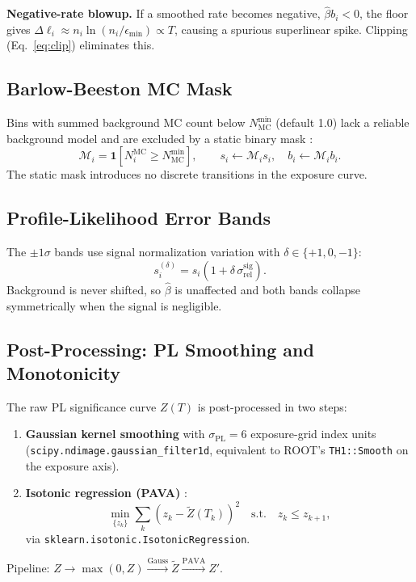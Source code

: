 \documentclass[12pt,a4paper]{article}
\newcommand{\bhat}{\hat{\beta}}
\newcommand{\srel}{\sigma_{\mathrm{rel}}}
\newcommand{\minexp}{\epsilon_{\min}}
\begin{document}
\medskip
\noindent\textbf{Negative-rate blowup.}
If a smoothed rate becomes negative, $\bhat b_i<0$, the floor gives
$\Delta\ell_i \approx n_i\ln(n_i/\minexp) \propto T$,
causing a spurious superlinear spike.
Clipping (Eq.~\eqref{eq:clip}) eliminates this.

\subsection{Barlow-Beeston MC Mask}
\label{sec:bb_mask}

Bins with summed background MC count below $N_{\mathrm{MC}}^{\min}$ (default 1.0)
lack a reliable background model and are excluded by a static binary mask
\cite{BarlowBeeston1993}:
\begin{equation}
  \mathcal{M}_i = \mathbf{1}\!\left[N_i^{\mathrm{MC}} \ge N_{\mathrm{MC}}^{\min}\right],
  \qquad
  s_i \leftarrow \mathcal{M}_i s_i,\quad b_i \leftarrow \mathcal{M}_i b_i.
  \label{eq:bb_mask_hep}
\end{equation}
The static mask introduces no discrete transitions in the exposure curve.

\subsection{Profile-Likelihood Error Bands}
\label{sec:pl_bands}

The $\pm1\sigma$ bands use signal normalization variation with
$\delta\in\{+1,0,-1\}$:
\begin{equation}
  s_i^{(\delta)} = s_i(1 + \delta\,\srel^{\mathrm{sig}}).
  \label{eq:signal_variation}
\end{equation}
Background is never shifted, so $\bhat$ is unaffected and both bands
collapse symmetrically when the signal is negligible.

\subsection{Post-Processing: PL Smoothing and Monotonicity}
\label{sec:pl_smooth}

The raw PL significance curve $Z(T)$ is post-processed in two steps:
\begin{enumerate}[leftmargin=*]
  \item \textbf{Gaussian kernel smoothing} with $\sigma_{\mathrm{PL}}=6$
    exposure-grid index units (\texttt{scipy.ndimage.gaussian\_filter1d},
    equivalent to ROOT's \texttt{TH1::Smooth} on the exposure axis).
  \item \textbf{Isotonic regression (PAVA)} \cite{Robertson1988}:
    \begin{equation}
      \min_{\{z_k\}}\sum_k(z_k-\tilde{Z}(T_k))^2
      \quad\text{s.t.}\quad z_k\le z_{k+1},
      \label{eq:pava}
    \end{equation}
    via \texttt{sklearn.isotonic.IsotonicRegression}.
\end{enumerate}
Pipeline: $Z \to \max(0,Z) \xrightarrow{\mathrm{Gauss}} \tilde{Z} \xrightarrow{\mathrm{PAVA}} Z'$.
\end{document}
